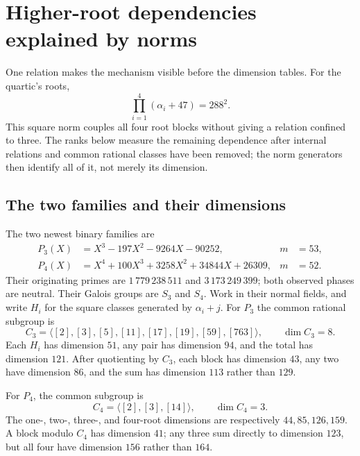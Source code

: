 \documentclass[11pt]{article}
\theoremstyle{definition}\newtheorem{definition}[theorem]{Definition}
\begin{document}
\section{Higher-root dependencies explained by norms}\label{sec:norms}
One relation makes the mechanism visible before the dimension tables.
For the quartic's roots,
\[
 \prod_{i=1}^4(\alpha_i+47)=288^2.
\]
This square norm couples all four root blocks without giving a relation
confined to three. The ranks below measure the remaining dependence after
internal relations and common rational classes have been removed; the
norm generators then identify all of it, not merely its dimension.

\subsection{The two families and their dimensions}
The two newest binary families are
\begin{align*}
 P_3(X)&=X^3-197X^2-9264X-90252,&m&=53,\\
 P_4(X)&=X^4+100X^3+3258X^2+34844X+26309,&m&=52.
\end{align*}
Their originating primes are $1\,779\,238\,511$ and
$3\,173\,249\,399$; both observed phases are neutral. Their Galois
groups are $S_3$ and $S_4$. Work in their normal fields, and write
$H_i$ for the square classes generated by $\alpha_i+j$.
For $P_3$ the common rational subgroup is
\[
 C_3=\langle[2],[3],[5],[11],[17],[19],[59],[763]\rangle,
 \qquad\dim C_3=8.
\]
Each $H_i$ has dimension $51$, any pair has dimension $94$, and
the total has dimension $121$. After quotienting by $C_3$, each
block has dimension $43$, any two have dimension $86$, and the
sum has dimension $113$ rather than $129$.

For $P_4$, the common subgroup is
\[
 C_4=\langle[2],[3],[14]\rangle,\qquad\dim C_4=3.
\]
The one-, two-, three-, and four-root dimensions are respectively
$44,85,126,159$. A block modulo $C_4$ has dimension $41$; any
three sum directly to dimension $123$, but all four have dimension
$156$ rather than $164$.
\end{document}

